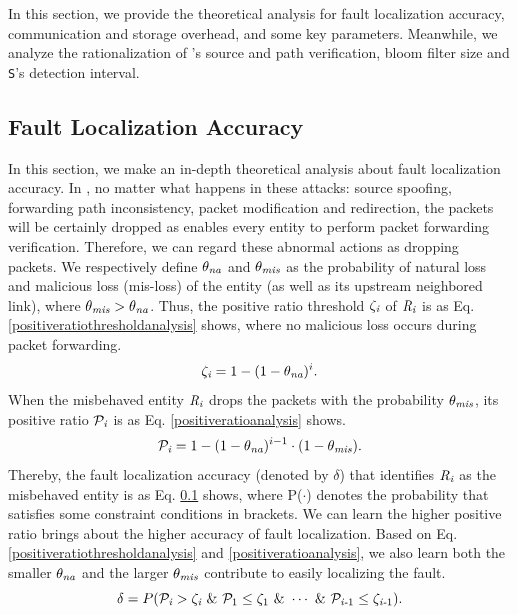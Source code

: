 In this section, we provide the theoretical analysis for fault localization accuracy, communication and storage overhead, and some key parameters. Meanwhile, we analyze the rationalization of \name{}'s source and path verification, bloom filter size and {\tt S}'s detection interval.
\vspace{-0.1in}
\subsection{Fault Localization Accuracy}
\label{localizationaccuracyanalysis}
In this section, we make an in-depth theoretical analysis about fault localization accuracy. In \name{}, no matter what happens in these attacks: source spoofing, forwarding path inconsistency, packet modification and redirection, the packets will be certainly dropped as \name{} enables every entity to perform packet forwarding verification. Therefore, we can regard these abnormal actions as dropping packets.
We respectively define $\theta_{\emph{na}}$ and $\theta_{\emph{mis}}$ as the probability of natural loss and malicious loss (mis-loss) of the entity (as well as its upstream neighbored link), where $\theta_{\emph{mis}} > \theta_{\emph{na}}$.
Thus, the positive ratio threshold $\zeta_\emph{i}$ of $\emph{R}_\emph{i}$ is as Eq. \ref{positiveratiothresholdanalysis} shows, where no malicious loss occurs during packet forwarding.
\begin{equation}\label{positiveratiothresholdanalysis}
\zeta_\emph{i} = 1 - (1 - \theta_{\emph{na}})^i.
\end{equation}
When the misbehaved entity $\emph{R}_\emph{i}$ drops the packets with the probability $\theta_{\emph{mis}}$, its positive ratio $\mathcal{P}_\emph{i}$ is as Eq. \ref{positiveratioanalysis} shows.
\begin{equation}\label{positiveratioanalysis}
\mathcal{P}_\emph{i} = 1 - (1 - \theta_{\emph{na}})^{i-1}\cdot(1 - \theta_{\emph{mis}}).
\end{equation}
Thereby, the fault localization accuracy (denoted by $\delta$) that identifies $\emph{R}_\emph{i}$ as the misbehaved entity is as Eq. \ref{localizationaccuracyanalysis} shows, where P($\cdot$) denotes the probability that satisfies some constraint conditions in brackets. We can learn the higher positive ratio brings about the higher accuracy of fault localization. Based on Eq. \ref{positiveratiothresholdanalysis} and \ref{positiveratioanalysis}, we also learn both the smaller $\theta_{\emph{na}}$ and the larger $\theta_{\emph{mis}}$ contribute to easily localizing the fault.
\begin{equation}\label{localizationaccuracyanalysis}
\delta = P(\mathcal{P}_\emph{i} > \zeta_\emph{i}~\&~\mathcal{P}_1 \leq \zeta_1~\&~\cdots~\&~\mathcal{P}_{\emph{i-}1} \leq \zeta_{\emph{i-}1}).
\end{equation}
\vspace{-0.1in}
